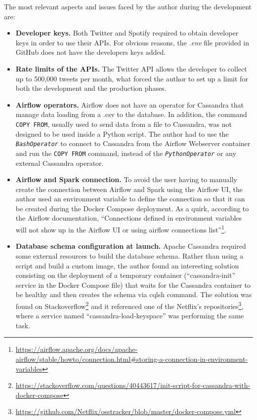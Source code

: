 


\nonzeroparskip The most relevant aspects and issues faced by the author during the development are:
\begin{itemize}
	\item \textbf{Developer keys.} Both Twitter and Spotify required to obtain developer keys in order to use their APIs. For obvious reasons, the \textit{.env} file provided in GitHub does not have the developers keys added.
	\item \textbf{Rate limits of the APIs.} The Twitter API allows the developer to collect up to 500,000 tweets per month, what forced the author to set up a limit for both the development and the production phases.
	\item \textbf{Airflow operators.} Airflow does not have an operator for Cassandra that manage data loading from a .csv to the database. In addition, the command \texttt{COPY FROM}, usually used to send data from a file to Cassandra, was not designed to be used inside a Python script. The author had to use the \texttt{\textit{BashOperator}} to connect to Cassandra from the Airflow Webserver container and run the \texttt{COPY FROM} command, instead of the \texttt{\textit{PythonOperator}} or any external Cassandra operator.
	\item \textbf{Airflow and Spark connection.} To avoid the user having to manually create the connection between Airflow and Spark using the Airflow UI, the author used an environment variable to define the connection so that it can be created during the Docker Compose deployment. As a quirk, according to the Airflow documentation, ``Connections defined in environment variables will not show up in the Airflow UI or using airflow connections list''\footnote{\url{https://airflow.apache.org/docs/apache-airflow/stable/howto/connection.html\#storing-a-connection-in-environment-variables}}.
	\item \textbf{Database schema configuration at launch.} Apache Cassandra required some external resources to build the database schema. Rather than using a script and build a custom image, the author found an interesting solution consisting on the deployment of a temporary container (``cassandra-init'' service in the Docker Compose file) that waits for the Cassandra container to be healthy and then creates the schema via cqlsh command. The solution was found on Stackoverflow\footnote{\url{https://stackoverflow.com/questions/40443617/init-script-for-cassandra-with-docker-compose}} and it referenced one of the Netflix's repositories\footnote{\url{https://github.com/Netflix/osstracker/blob/master/docker-compose.yml}}, where a service named ``cassandra-load-keyspace'' was performing the same task.

\end{itemize}
